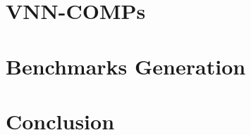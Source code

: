 \documentclass[oneside,11pt,dvipsnames]{book}
\numberwithin{equation}{section}
\theoremstyle{definition}
\theoremstyle{remark}
\begin{document}
\chapter{VNN-COMPs}\label{chap:vnncomps}

\chapter{Benchmarks Generation}\label{chap:benchmarks-generation}



\chapter{Conclusion}




\appendix
\end{document}
